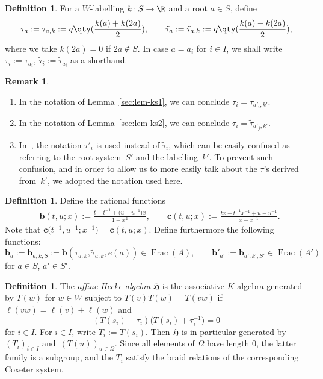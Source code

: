 \documentclass[pdftex]{sigma}
\theoremstyle{definition}
\newtheorem{Definition}[Theorem]{Definition}
\newtheorem{Remark}[Theorem]{Remark}
\numberwithin{equation}{section}
\begin{document}
\begin{Definition}\label{def-tau}
 For a $W$-labelling $k\colon S\to\R$ and a root $a\in S$, define
 \[
 \tau_a := \tau_{a,k}:= q\qty(\frac{k(a)+k(2a)}{2}),\qquad
 \tilde{\tau}_a := \tilde{\tau}_{a,k} := q\qty(\frac{k(a)-k(2a)}{2}),
 \]
 where we take $k(2a)=0$ if $2a\not\in S$. In case $a=a_i$ for $i\in I$, we shall write
$\tau_i := \tau_{a_i}$, $ \tilde{\tau}_i := \tilde{\tau}_{a_i}$
 as a shorthand.
\end{Definition}

\begin{Remark}\label{sec:rem-taus}\leavevmode
\begin{enumerate}\itemsep=0pt
 \item[(i)] In the notation of Lemma~\ref{sec:lem-ks1},
 we can conclude
$
 \tau_i = \tau_{a'_i,k'}$.
 \item[(ii)] In the notation of Lemma~\ref{sec:lem-ks2}, we can conclude
$
 \tau_i = \tilde{\tau}_{a'_j,k'}$.
 \item[(iii)] In~\cite{macdonald}, the notation $\tau'_i$ is used instead of
 $\tilde{\tau}_i$, which can be easily confused as referring to the root system~$S'$ and the labelling~$k'$. To prevent such confusion, and in order to allow us
 to more easily talk about the $\tau$'s derived from~$k'$, we adopted the notation
 used here.
\end{enumerate}
\end{Remark}

\begin{Definition}
 Define the rational functions
 \begin{align*}
& \bm{b}(t,u;x):= \frac{t-t^{-1} + \bigl(u-u^{-1}\bigr)x}{1-x^2},\qquad
 \bm{c}(t,u;x) := \frac{tx - t^{-1}x^{-1} + u-u^{-1}}{x-x^{-1}}.
 \end{align*}
 Note that $\bm{c}\bigl(t^{-1},u^{-1};x^{-1}\bigr)=\bm{c}(t,u;x)$. Define
 furthermore the following functions:
 \[
 \bm{b}_a := \bm{b}_{a,k,S} := \bm{b}(\tau_{a,k},\tilde{\tau}_{a,k}, e(a))\in \operatorname{Frac}(A),\qquad
 \bm{b}'_{a'} := \bm{b}_{a',k',S'}\in\operatorname{Frac}(A')
 \]
 for $a\in S$, $a'\in S'$.
\end{Definition}

\begin{Definition}
 The \emph{affine Hecke algebra} $\mathfrak{H}$ is the associative $K$-algebra generated by
 $T(w)$ for $w\in W$ subject to
$
 T(v)T(w)=T(vw)$ if $ \ell(vw)=\ell(v)+\ell(w)$
 and
 \[
 (T(s_i)-\tau_i)\bigl(T(s_i)+\tau_i^{-1}\bigr) = 0
 \]
 for $i\in I$. For $i\in I$, write $T_i:= T(s_i)$. Then
 $\mathfrak{H}$ is in particular generated by $(T_i)_{i\in I}$ and~$(T(u))_{u\in\Omega}$. Since all elements of $\Omega$ have length 0,
 the latter family is a subgroup, and the $T_i$ satisfy the braid relations
 of the corresponding Coxeter system.
\end{Definition}
\end{document}
